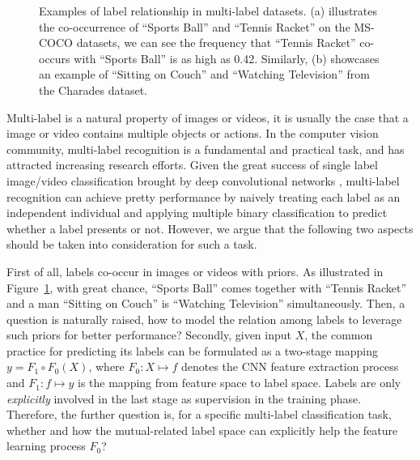 \documentclass[letterpaper]{article} \usepackage{aaai20}  \usepackage{times}  \usepackage{helvet} \usepackage{courier}  \usepackage[hyphens]{url}  \usepackage{graphicx} \usepackage{subfigure}
\begin{document}
\begin{figure}[!t]
	\centering
	\caption{Examples of label relationship in multi-label datasets. (a) illustrates the co-occurrence of ``Sports Ball'' and ``Tennis Racket'' on the MS-COCO datasets, we can see the frequency that ``Tennis Racket'' co-occurs with ``Sports Ball'' is as high as 0.42. Similarly, (b) showcases an example of ``Sitting on Couch'' and ``Watching Television'' from the Charades dataset.}
	\label{include}
\end{figure}
Multi-label is a natural property of images or videos, it is usually the case that a image or video contains multiple objects or actions. In the computer vision community, multi-label recognition is a fundamental and practical task, and has attracted increasing research efforts. Given the great success of single label image/video classification brought by deep convolutional networks \cite{he2015delving,carreira2017quo,resnet,feichtenhofer2018slowfast,wu2019long}, multi-label recognition can achieve pretty performance by naively treating each label as an independent individual and applying multiple binary classification to predict whether a label presents or not. However, we argue that the following two aspects should be taken into consideration for such a task.


First of all, labels co-occur in images or videos with priors. As illustrated in Figure~\ref{include}, with great chance, ``Sports Ball'' comes together with ``Tennis Racket'' and a man ``Sitting on Couch'' is ``Watching Television'' simultaneously. Then, a question is naturally raised, how to model the relation among labels to leverage such priors for better performance? Secondly, given input $X$, the common practice for predicting its labels can be formulated as a two-stage mapping $y=F_1\circ F_0(X)$, where $F_0:X\mapsto f$ denotes the CNN feature extraction process and $F_1: f\mapsto y$ is the mapping from feature space to label space. Labels are only \emph{explicitly} involved in the last stage as supervision in the training phase. Therefore, the further question is, for a specific multi-label classification task, whether and how the mutual-related label space can explicitly help the feature learning process $F_0$?
\end{document}
